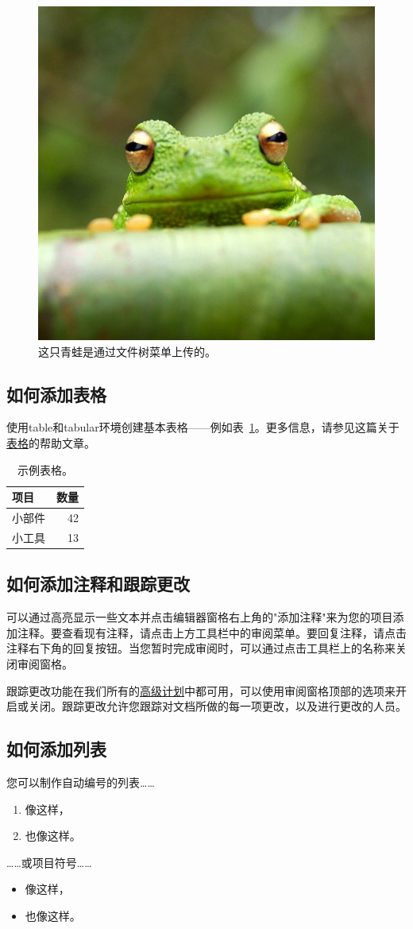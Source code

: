 \documentclass{article}
\begin{document}
\begin{figure}
\centering
\includegraphics[width=0.25\linewidth]{frog.jpg}
\caption{\label{fig:frog}这只青蛙是通过文件树菜单上传的。}
\end{figure}

\subsection{如何添加表格}

使用table和tabular环境创建基本表格——例如表~\ref{tab:widgets}。更多信息，请参见这篇关于\href{https://www.overleaf.com/learn/latex/tables}{表格}的帮助文章。

\begin{table}
\centering
\begin{tabular}{l|r}
项目 & 数量 \\\hline
小部件 & 42 \\
小工具 & 13
\end{tabular}
\caption{\label{tab:widgets}示例表格。}
\end{table}

\subsection{如何添加注释和跟踪更改}

可以通过高亮显示一些文本并点击编辑器窗格右上角的"添加注释"来为您的项目添加注释。要查看现有注释，请点击上方工具栏中的审阅菜单。要回复注释，请点击注释右下角的回复按钮。当您暂时完成审阅时，可以通过点击工具栏上的名称来关闭审阅窗格。

跟踪更改功能在我们所有的\href{https://www.overleaf.com/user/subscription/plans}{高级计划}中都可用，可以使用审阅窗格顶部的选项来开启或关闭。跟踪更改允许您跟踪对文档所做的每一项更改，以及进行更改的人员。

\subsection{如何添加列表}

您可以制作自动编号的列表……

\begin{enumerate}
\item 像这样，
\item 也像这样。
\end{enumerate}
……或项目符号……
\begin{itemize}
\item 像这样，
\item 也像这样。
\end{itemize}
\end{document}

